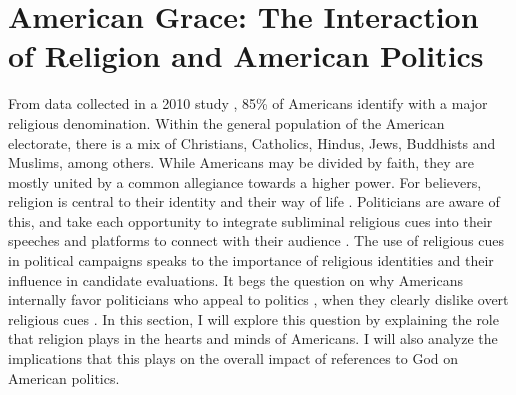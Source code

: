\documentclass[letterpaper,man,natbib,noextraspace,12pt]{apa6}  %
\begin{document}
\section{American Grace: The Interaction of Religion and American Politics}

From data collected in a 2010 study \citep{putnam_american_2010}, 85\% of Americans identify with a major religious denomination. Within the general population of the American electorate, there is a mix of Christians, Catholics, Hindus, Jews, Buddhists and Muslims, among others. While Americans may be divided by faith, they are mostly united by a common allegiance towards a higher power. For believers, religion is central to their identity and their way of life \citep{wald_religion_2011}. Politicians are aware of this, and take each opportunity to integrate subliminal religious cues into their speeches and platforms to connect with their audience \citep{albertson_religious_2011, domke_god_2008}. The use of religious cues in political campaigns speaks to the importance of religious identities and their influence in candidate evaluations. It begs the question on why Americans internally favor politicians who appeal to politics \citep{albertson_religious_2011}, when they clearly dislike overt religious cues \citep{mclaughlin_cueing_2014}. In this section, I will explore this question by explaining the role that religion plays in the hearts and minds of Americans. I will also analyze the implications that this plays on the overall impact of references to God on American politics.
\end{document}
